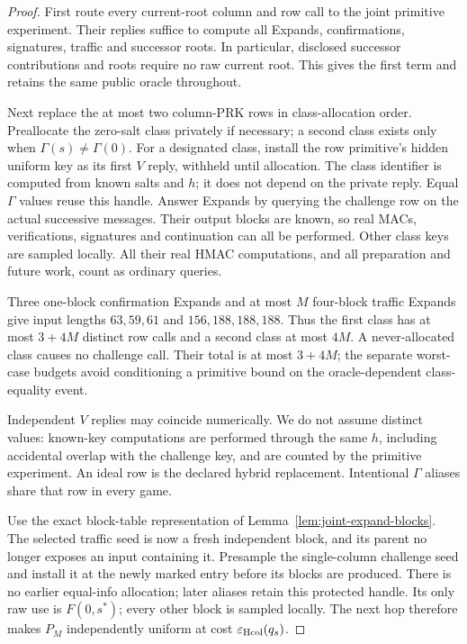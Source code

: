 \begin{proof}
First route every current-root column and row call to the joint primitive
experiment. Their replies suffice to compute all Expands, confirmations,
signatures, traffic and successor roots. In particular, disclosed successor
contributions and roots require no raw current root. This gives the first
term and retains the same public oracle throughout.

Next replace the at most two column-PRK rows in class-allocation order.
Preallocate the zero-salt class privately if necessary; a second class
exists only when $\Gamma(s)\ne\Gamma(0)$. For a designated class, install
the row primitive's hidden uniform key as its first $V$ reply, withheld
until allocation. The class identifier is computed from known salts and $h$;
it does not depend on the private reply. Equal $\Gamma$ values reuse this
handle. Answer Expands by querying the challenge row on the actual
successive messages. Their output blocks are known, so real MACs,
verifications, signatures and continuation can all be performed.
Other class keys are sampled locally. All their real HMAC computations,
and all preparation and future work, count as ordinary queries.

Three one-block confirmation Expands and at most $M$ four-block traffic
Expands give input lengths $63,59,61$ and $156,188,188,188$. Thus the
first class has at most $3+4M$ distinct row calls and a second class at most
$4M$. A never-allocated class causes no challenge call. Their total is at
most $3+4M$; the separate worst-case budgets avoid conditioning a
primitive bound on the oracle-dependent class-equality event.

Independent $V$ replies may coincide numerically. We do not assume distinct values:
known-key computations are performed through the same $h$, including
accidental overlap with the challenge key, and are counted by the
primitive experiment. An ideal row is the declared hybrid replacement.
Intentional $\Gamma$ aliases share that row in every game.

Use the exact block-table representation of Lemma~\ref{lem:joint-expand-blocks}.
The selected traffic seed
is now a fresh independent block, and its parent no longer exposes an
input containing it. Presample the single-column challenge seed and
install it at the newly marked entry before its blocks are produced.
There is no earlier equal-info allocation; later aliases retain this
protected handle.
Its only raw use is $F(0,s^*)$; every other block is sampled locally.
The next hop therefore makes $P_M$ independently uniform at cost
$\varepsilon_{\rm Hcol}(q_s)$.


\end{proof}
